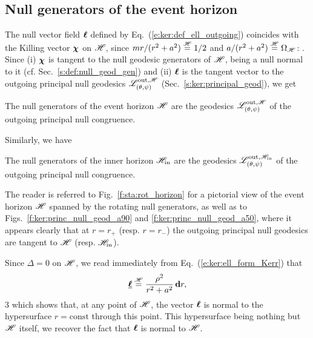 \subsection{Null generators of the event horizon} \label{s:gek:null_gen_hor}

The null vector field $\bm{\ell}$ defined by Eq.~(\ref{e:ker:def_ell_outgoing}) coincides with the Killing vector $\bm{\chi}$ on $\mathscr{H}$,
since $m r/(r^2 + a^2) \stackrel{\mathscr{H}}{=} 1/2$ and $a/(r^2+a^2) \stackrel{\mathscr{H}}{=} \Omega_{\mathscr{H}}$:
\be \label{e:ker:l_eqH_chi}
    \wl \equalH \w{\chi} .
\ee
Since (i) $\bm{\chi}$ is tangent
to the null geodesic generators of $\mathscr{H}$, being a null normal to it (cf. Sec.~\ref{s:def:null_geod_gen}) and (ii) $\bm{\ell}$ is the tangent vector to the
outgoing principal null geodesics $\mathscr{L}^{{\rm out},\mathscr{H}}_{(\theta,\psi)}$ (Sec.~\ref{s:ker:principal_geod}),
we get
\begin{prop}
The null generators of the event horizon $\mathscr{H}$ are the
geodesics $\mathscr{L}^{{\rm out},\mathscr{H}}_{(\theta,\psi)}$
of the outgoing principal null congruence.
\end{prop}

Similarly, we have
\begin{prop}
The null generators of the inner horizon $\mathscr{H}_{\rm in}$ are the
geodesics $\mathscr{L}^{{\rm out},\mathscr{H}_{\rm in}}_{(\theta,\psi)}$
of the outgoing principal null congruence.
\end{prop}

The reader is referred to Fig.~\ref{f:sta:rot_horizon} for a pictorial
view of the event horizon $\mathscr{H}$ spanned by the rotating null generators,
as well as to Figs.~\ref{f:ker:princ_null_geod_a90} and \ref{f:ker:princ_null_geod_a50},
where it appears clearly that at $r=r_+$ (resp. $r=r_-$) the outgoing principal null geodesics are
tangent to $\mathscr{H}$ (resp. $\mathscr{H}_{\rm in}$).

\begin{remark}
Since $\Delta=0$ on $\mathscr{H}$, we read immediately from Eq.~(\ref{e:ker:ell_form_Kerr})
that
\[
    \underline{\bm{\ell}} \stackrel{\mathscr{H}}{=} \frac{\rho^2}{r^2 + a^2} \, \mathbf{d} r ,
\]3
which shows that, at any point of $\mathscr{H}$, the vector $\bm{\ell}$ is normal to
the hypersurface $r = \mathrm{const}$ through this point. This hypersurface
being nothing but $\mathscr{H}$ itself, we recover the fact that $\bm{\ell}$ is normal
to $\mathscr{H}$.
\end{remark}

